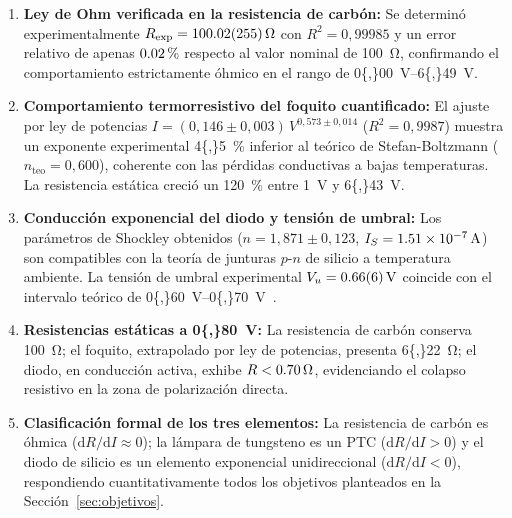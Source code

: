 \begin{enumerate}
    \item \textbf{Ley de Ohm verificada en la resistencia de carbón:} Se determinó experimentalmente $R_{\text{exp}} = \qty{100{,}02 \pm 2{,}55}{\ohm}$ con $R^2 = 0{,}99985$ y un error relativo de apenas $\qty{0{,}02}{\percent}$ respecto al valor nominal de \qty{100}{\ohm}, confirmando el comportamiento estrictamente óhmico en el rango de \qtyrange{0{,}00}{6{,}49}{\volt}.

    \item \textbf{Comportamiento termorresistivo del foquito cuantificado:} El ajuste por ley de potencias $I = (0{,}146 \pm 0{,}003)\,V^{0{,}573 \pm 0{,}014}$ ($R^2 = 0{,}9987$) muestra un exponente experimental \qty{4{,}5}{\percent} inferior al teórico de Stefan-Boltzmann ($n_{\text{teo}} = 0{,}600$), coherente con las pérdidas conductivas a bajas temperaturas. La resistencia estática creció un \qty{120}{\percent} entre \qty{1}{\volt} y \qty{6{,}43}{\volt}.

    \item \textbf{Conducción exponencial del diodo y tensión de umbral:} Los parámetros de Shockley obtenidos ($n = 1{,}871 \pm 0{,}123$, $I_S = \qty{1{,}51e-7}{\ampere}$) son compatibles con la teoría de junturas $p$-$n$ de silicio a temperatura ambiente. La tensión de umbral experimental $V_u = \qty{0{,}66 \pm 0{,}06}{\volt}$ coincide con el intervalo teórico de \qtyrange{0{,}60}{0{,}70}{\volt}~\cite{boylestad}.

    \item \textbf{Resistencias estáticas a \qty{0{,}80}{\volt}:} La resistencia de carbón conserva \qty{100}{\ohm}; el foquito, extrapolado por ley de potencias, presenta \qty{6{,}22}{\ohm}; el diodo, en conducción activa, exhibe $R < \qty{0{,}70}{\ohm}$, evidenciando el colapso resistivo en la zona de polarización directa.

    \item \textbf{Clasificación formal de los tres elementos:} La resistencia de carbón es óhmica ($\mathrm{d}R/\mathrm{d}I \approx 0$); la lámpara de tungsteno es un PTC ($\mathrm{d}R/\mathrm{d}I > 0$) y el diodo de silicio es un elemento exponencial unidireccional ($\mathrm{d}R/\mathrm{d}I < 0$), respondiendo cuantitativamente todos los objetivos planteados en la Sección~\ref{sec:objetivos}.
\end{enumerate}
